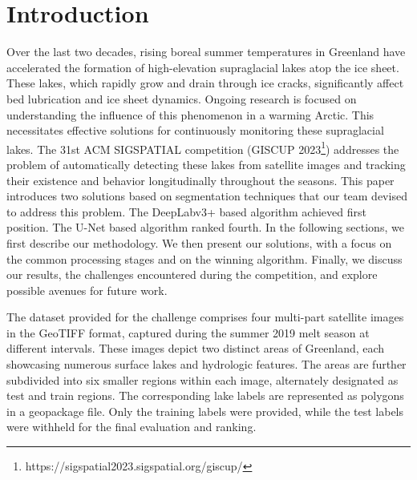 \documentclass[sigconf]{acmart}
\begin{document}


\maketitle

\section{Introduction}

Over the last two decades, rising boreal summer temperatures in Greenland have accelerated the formation of high-elevation supraglacial lakes atop the ice sheet.
These lakes, which rapidly grow and drain through ice cracks, significantly affect bed lubrication and ice sheet dynamics.
Ongoing research is focused on understanding the influence of this phenomenon in a warming Arctic.
This necessitates effective solutions for continuously monitoring these supraglacial lakes.
The 31st ACM SIGSPATIAL competition (GISCUP 2023\footnote{https://sigspatial2023.sigspatial.org/giscup/}) addresses the problem of automatically detecting these lakes from satellite images and tracking their existence and behavior longitudinally throughout the seasons.
This paper introduces two solutions based on segmentation techniques that our team devised to address this problem.
The DeepLabv3+\cite{chen2018encoderdecoder} based algorithm achieved first position. The U-Net\cite{ronneberger2015unet} based algorithm ranked fourth.
In the following sections, we first describe our methodology. We then present our solutions, with a focus on the common processing stages and on the winning algorithm. Finally, we discuss our results, the challenges encountered during the competition, and explore possible avenues for future work.

The dataset provided for the challenge comprises four multi-part satellite images in the GeoTIFF format, captured during the summer 2019 melt season at different intervals.
These images depict two distinct areas of Greenland, each showcasing numerous surface lakes and hydrologic features.
The areas are further subdivided into six smaller regions within each image, alternately designated as test and train regions. The corresponding lake labels are represented as polygons in a geopackage file.
Only the training labels were provided, while the test labels were withheld for the final evaluation and ranking.
\end{document}

